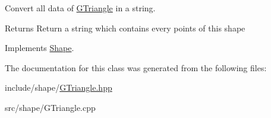 Convert all data of \hyperlink{classGTriangle}{G\+Triangle} in a string. 

\begin{DoxyReturn}{Returns}
Return a string which contains every points of this shape 
\end{DoxyReturn}


Implements \hyperlink{classShape_a98fa87c6dc4c7045fd6897a8f3bc186c}{Shape}.



The documentation for this class was generated from the following files\+:\begin{DoxyCompactItemize}
\item 
include/shape/\hyperlink{GTriangle_8hpp}{G\+Triangle.\+hpp}\item 
src/shape/G\+Triangle.\+cpp\end{DoxyCompactItemize}
